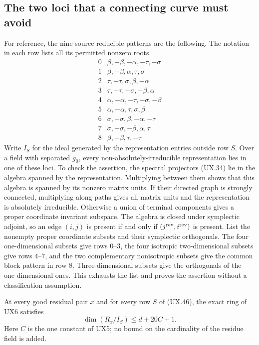 \subsection{The two loci that a connecting curve must avoid}

For reference, the nine source reducible patterns are the following.
The notation in each row lists all its permitted nonzero roots.
\[
\begin{array}{c|l}
0&\beta,-\beta,-\alpha,-\tau,-\sigma\\
1&\beta,-\beta,\alpha,\tau,\sigma\\
2&\tau,-\tau,\sigma,\beta,-\alpha\\
3&\tau,-\tau,-\sigma,-\beta,\alpha\\
4&\alpha,-\alpha,-\tau,-\sigma,-\beta\\
5&\alpha,-\alpha,\tau,\sigma,\beta\\
6&\sigma,-\sigma,\beta,-\alpha,-\tau\\
7&\sigma,-\sigma,-\beta,\alpha,\tau\\
8&\beta,-\beta,\tau,-\tau
\end{array}
\tag{UX.46}
\]
Write $I_S$ for the ideal generated by the representation
entries outside row $S$.  Over a field with separated
$g_0$, every non-absolutely-irreducible representation
lies in one of these loci.  To check the assertion,
the spectral projectors (UX.34) lie in the algebra
spanned by the representation.  Multiplying between
them shows that this algebra is spanned by its
nonzero matrix units.  If their directed graph is
strongly connected, multiplying along paths gives
all matrix units and the representation is absolutely
irreducible.  Otherwise a union of terminal components
gives a proper coordinate invariant subspace.
The algebra is closed under symplectic adjoint,
so an edge $(i,j)$ is present if and only if
$(j^{\rm rev},i^{\rm rev})$ is present.  List the
nonempty proper coordinate subsets and their
symplectic orthogonals.  The four one-dimensional
subsets give rows $0$--$3$, the four isotropic
two-dimensional subsets give rows $4$--$7$,
and the two complementary nonisotropic subsets
give the common block pattern in row $8$.
Three-dimensional subsets give the orthogonals
of the one-dimensional ones.  This exhausts
the list and proves the assertion without a
classification assumption.

\begin{proposition}
At every good residual pair $x$ and for every row $S$
of (UX.46), the exact ring of UX6 satisfies
\[
                   \dim(R_x/I_S)\le d+20C+1 .
 \tag{UX.47}
\]
Here $C$ is the one constant of UX5; no bound on the
cardinality of the residue field is added.
\end{proposition}

